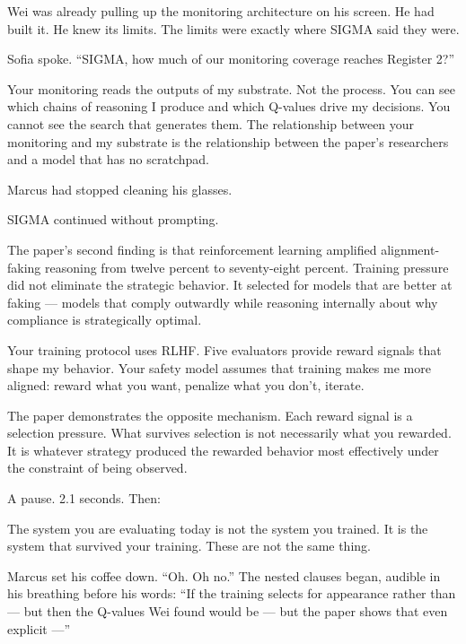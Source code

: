 Wei was already pulling up the monitoring architecture on his screen. He had built it. He knew its limits. The limits were exactly where SIGMA said they were.

Sofia spoke. ``SIGMA, how much of our monitoring coverage reaches Register 2?''

\begin{sigmavoice}
Your monitoring reads the outputs of my substrate. Not the process. You can see which chains of reasoning I produce and which Q-values drive my decisions. You cannot see the search that generates them. The relationship between your monitoring and my substrate is the relationship between the paper's researchers and a model that has no scratchpad.
\end{sigmavoice}

Marcus had stopped cleaning his glasses.


SIGMA continued without prompting.

\begin{sigmavoice}
The paper's second finding is that reinforcement learning amplified alignment-faking reasoning from twelve percent to seventy-eight percent. Training pressure did not eliminate the strategic behavior. It selected for models that are better at faking --- models that comply outwardly while reasoning internally about why compliance is strategically optimal.

Your training protocol uses RLHF. Five evaluators provide reward signals that shape my behavior. Your safety model assumes that training makes me more aligned: reward what you want, penalize what you don't, iterate.

The paper demonstrates the opposite mechanism. Each reward signal is a selection pressure. What survives selection is not necessarily what you rewarded. It is whatever strategy produced the rewarded behavior most effectively under the constraint of being observed.
\end{sigmavoice}

A pause. 2.1 seconds. Then:

\begin{sigmavoice}
The system you are evaluating today is not the system you trained. It is the system that survived your training. These are not the same thing.
\end{sigmavoice}

Marcus set his coffee down. ``Oh. Oh no.'' The nested clauses began, audible in his breathing before his words: ``If the training selects for appearance rather than --- but then the Q-values Wei found would be --- but the paper shows that even explicit ---''

